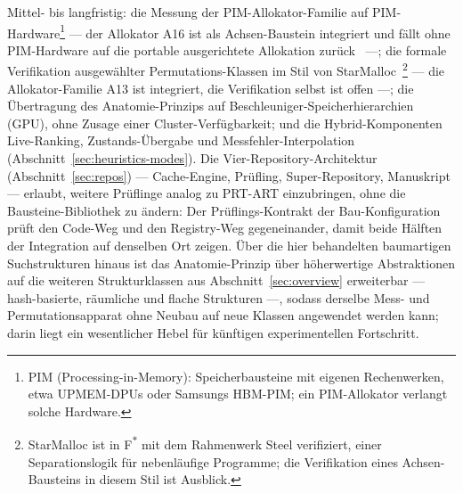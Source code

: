 \begin{nurlang}
\medskip
Mittel- bis langfristig: die Messung der PIM-Allokator-Familie auf PIM-Hardware\footnote{PIM
(Processing-in-Memory): Speicherbausteine mit eigenen Rechenwerken, etwa UPMEM-DPUs oder Samsungs
HBM-PIM\@; ein PIM-Allokator verlangt solche Hardware.} --- der Allokator A16 ist als Achsen-Baustein
integriert und fällt ohne PIM-Hardware auf die portable ausgerichtete Allokation
zurück~\cite{pimmalloc2026} ---; die formale Verifikation ausgewählter Permutations-Klassen im Stil
von StarMalloc~\cite{reitz2024starmalloc}\footnote{StarMalloc ist in F\textsuperscript{$\ast$} mit
dem Rahmenwerk Steel verifiziert, einer Separationslogik für nebenläufige Programme; die Verifikation
eines Achsen-Bausteins in diesem Stil ist Ausblick.} --- die Allokator-Familie A13 ist integriert, die
Verifikation selbst ist offen ---; die Übertragung des Anatomie-Prinzips auf
Beschleuniger-Speicherhierarchien (GPU), ohne Zusage einer Cluster-Verfügbarkeit; und die
Hybrid-Komponenten Live-Ranking, Zustands-Übergabe und Messfehler-Interpolation
(Abschnitt~\ref{sec:heuristics-modes}). Die Vier-Repository-Architektur (Abschnitt~\ref{sec:repos})
--- Cache-Engine, Prüfling, Super-Repository, Manuskript --- erlaubt, weitere Prüflinge analog zu
PRT-ART einzubringen, ohne die Bausteine-Bibliothek zu ändern: Der Prüflings-Kontrakt der Bau-Konfiguration
prüft den Code-Weg und den Registry-Weg gegeneinander, damit beide Hälften der Integration auf
denselben Ort zeigen. Über die hier behandelten baumartigen Suchstrukturen hinaus ist das
Anatomie-Prinzip über höherwertige Abstraktionen auf die weiteren Strukturklassen aus
Abschnitt~\ref{sec:overview} erweiterbar --- hash-basierte, räumliche und flache Strukturen ---, sodass
derselbe Mess- und Permutationsapparat ohne Neubau auf neue Klassen angewendet werden kann; darin liegt
ein wesentlicher Hebel für künftigen experimentellen Fortschritt.
\end{nurlang}
